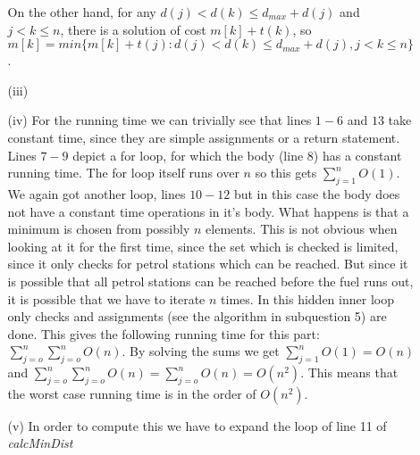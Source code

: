 \documentclass{article}
\begin{document}
\begin{itemize}
\begin{itemize}
On the other hand, for any $d(j) < d(k) \le d_{max} + d(j)$ and $j<k\le n$, there is a solution of cost $m[k]+t(k)$, so $m[k] = min\{ m[k] + t(j) : d(j) < d(k) \le d_{max} + d(j), j<k\le n\}$.

\item[(iii)]
\begin{algorithmic}[1]
\ENDFOR
{}
\ENDFOR
{}

\end{algorithmic}


\item[(iv)] For the running time we can trivially see that lines $1-6$ and $13$ take constant time, since they are simple assignments or a return statement. Lines $7-9$ depict a for loop, for which the body (line 8) has a constant running time. The for loop itself runs over $n$ so this gets $\sum_{j=1}^n{O(1)}$. We again got another loop, lines $10-12$ but in this case the body does not have a constant time operations in it's body. What happens is that a minimum is chosen from possibly $n$ elements. This is not obvious when looking at it for the first time, since the set which is checked is limited, since it only checks for petrol stations which can be reached. But since it is possible that all petrol stations can be reached before the fuel runs out, it is possible that we have to iterate $n$ times. In this hidden inner loop only checks and assignments (see the algorithm in subquestion 5) are done. This gives the following running time for this part: $\sum_{j=o}^n{\sum_{j=o}^n{O(n)}}$. By solving the sums we get $\sum_{j=1}^n{O(1)}=O(n)$ and $\sum_{j=o}^n{\sum_{j=o}^n{O(n)}}=\sum_{j=o}^n{O(n)}=O(n^2)$. This means that the worst case running time is in the order of $O(n^2)$.

\item[(v)] 
In order to compute this we have to expand the loop of line 11 of \emph{calcMinDist}


\end{itemize}
\end{itemize}
\end{document}
